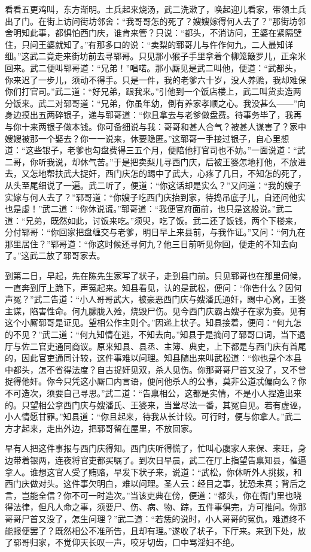 看看五更鸡叫，东方渐明。土兵起来烧汤，武二洗漱了，唤起迎儿看家，带领土兵出了门。在街上访问街坊邻舍：“我哥哥怎的死了？嫂嫂嫁得何人去了？”那街坊邻舍明知此事，都惧怕西门庆，谁肯来管？只说：“都头，不消访问，王婆在紧隔壁住，只问王婆就知了。”有那多口的说：“卖梨的郓哥儿与仵作何九，二人最知详细。”这武二竟走来街坊前去寻郓哥。只见那小猴子手里拿着个柳笼簸罗儿，正籴米回来。武二便叫郓哥道：“兄弟！”唱喏。那小厮见是武二叫他，便道：“武都头，你来迟了一步儿，须动不得手。只是一件，我的老爹六十岁，没人养赡，我却难保你们打官司。”武二道：“好兄弟，跟我来。”引他到一个饭店楼上，武二叫货卖造两分饭来。武二对郓哥道：“兄弟，你虽年幼，倒有养家孝顺之心。我没甚么——”向身边摸出五两碎银子，递与郓哥道：“你且拿去与老爹做盘费。待事务毕了，我再与你十来两银子做本钱。你可备细说与我：哥哥和甚人合气？被甚人谋害了？家中嫂嫂被那一个娶去？你一一说来，休要隐匿。”这郓哥一手接过银子，自心里想道：“这些银子，老爹也勾盘费得三五个月，便陪他打官司也不妨。”一面说道：“武二哥，你听我说，却休气苦。”于是把卖梨儿寻西门庆，后被王婆怎地打他，不放进去，又怎地帮扶武大捉奸，西门庆怎的踢中了武大，心疼了几日，不知怎的死了，从头至尾细说了一遍。武二听了，便道：“你这话却是实么？”又问道：“我的嫂子实嫁与何人去了？”郓哥道：“你嫂子吃西门庆抬到家，待捣吊底子儿，自还问他实也是虚！”武二道：“你休说谎。”郓哥道：“我便官府面前，也只是这般说。”武二道：“兄弟，既然如此，讨饭来吃。”须臾，吃了饭。武二还了饭钱，两个下楼来，分付郓哥：“你回家把盘缠交与老爹，明日早上来县前，与我作证。”又问：“何九在那里居住？”郓哥道：“你这时候还寻何九？他三日前听见你回，便走的不知去向了。”这武二放了郓哥家去。

到第二日，早起，先在陈先生家写了状子，走到县门前。只见郓哥也在那里伺候，一直奔到厅上跪下，声冤起来。知县看见，认的是武松，便问：“你告什么？因何声冤？”武二告道：“小人哥哥武大，被豪恶西门庆与嫂潘氏通奸，踢中心窝，王婆主谋，陷害性命。何九朦胧入殓，烧毁尸伤。见今西门庆霸占嫂子在家为妾。见有这个小厮郓哥是证见。望相公作主则个。”因递上状子。知县接着，便问：“何九怎的不见？”武二道：“何九知情在逃，不知去向。”知县于是摘问了郓哥口词，当下退厅与佐二官吏通同商议。原来知县、县丞、主簿、典史，上下都是与西门庆有首尾的，因此官吏通同计较，这件事难以问理。知县随出来叫武松道：“你也是个本县中都头，怎不省得法度？自古捉奸见双，杀人见伤。你那哥哥尸首又没了，又不曾捉得他奸。你今只凭这小厮口内言语，便问他杀人的公事，莫非公道忒偏向么？你不可造次，须要自己寻思。”武二道：“告禀相公，这都是实情，不是小人捏造出来的。只望相公拿西门庆与嫂潘氏、王婆来，当堂尽法一番，其冤自见。若有虚诬，小人情愿甘罪。”知县道：“你且起来，待我从长计较。可行时，便与你拿人。”武二方才起来，走出外边，把郓哥留在屋里，不放回家。

早有人把这件事报与西门庆得知。西门庆听得慌了，忙叫心腹家人来保、来旺，身边带着银两，连夜将官吏都买嘱了。到次日早晨，武二在厅上指望告禀知县，催逼拿人。谁想这官人受了贿赂，早发下状子来，说道：“武松，你休听外人挑拨，和西门庆做对头。这件事欠明白，难以问理。圣人云：经目之事，犹恐未真；背后之言，岂能全信？你不可一时造次。”当该吏典在傍，便道：“都头，你在衙门里也晓得法律，但凡人命之事，须要尸、伤、病、物、踪，五件事俱完，方可推问。你那哥哥尸首又没了，怎生问理？”武二道：“若恁的说时，小人哥哥的冤仇，难道终不能报便罢了？既然相公不准所告，且却有理。”遂收了状子，下厅来。来到下处，放了郓哥归家，不觉仰天长叹一声，咬牙切齿，口中骂淫妇不绝。

